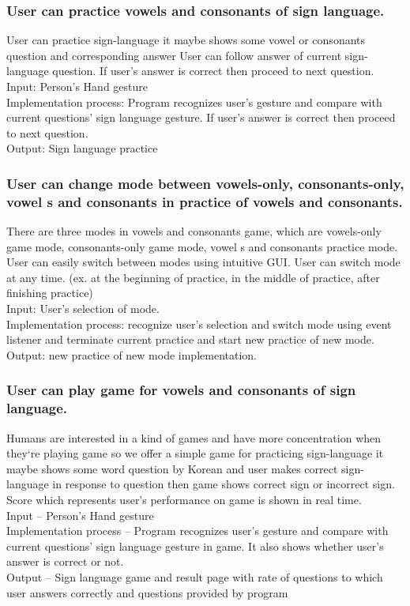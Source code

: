 \documentclass[10pt,journal,compsoc]{IEEEtran}
\begin{document}
\subsubsection{User can practice vowels and consonants of sign language.\\}
User can practice sign-language it maybe shows some vowel or consonants question and corresponding answer User can follow answer of current sign-language question. If user’s answer is correct then proceed to next question.
\\Input: Person's Hand gesture
\\Implementation process: Program recognizes user’s gesture and compare with current questions’ sign language gesture. If user’s answer is correct then proceed to next question.
\\Output: Sign language practice



\subsubsection{User can change mode between  vowels-only, consonants-only, vowel s and consonants in practice of vowels and consonants.\\}
There are three modes in vowels and consonants game, which are vowels-only game mode, consonants-only game mode, vowel s and consonants practice mode. User can easily switch between modes using intuitive GUI. User can switch mode at any time.
(ex. at the beginning of practice, in the middle of practice, after finishing practice)
\\Input: User’s selection of mode.
\\Implementation process: recognize user’s selection and switch mode using event listener and terminate current practice and start new practice of new mode. 
\\Output: new practice of new mode implementation.


\subsubsection{User can play game for vowels and consonants of sign language.\\}

Humans are interested in a kind of games and have more concentration when they`re playing game so we offer a simple game for practicing sign-language it maybe shows some word question by Korean and user makes correct sign-language in response to question then game shows correct sign or incorrect sign.
Score which represents user’s performance on game is shown in real time.
\\Input – Person's Hand gesture
\\Implementation process – Program recognizes user’s gesture and compare with current questions’ sign language gesture in game. It also shows whether user’s answer is correct or not.
\\Output – Sign language game and result page with rate of questions to which user answers correctly and questions provided by program
\end{document}
